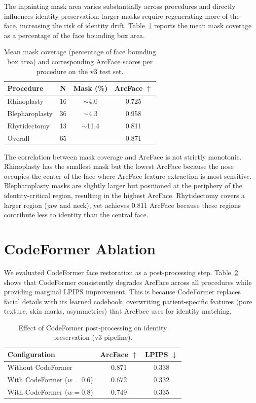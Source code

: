 \documentclass[10pt,twocolumn,letterpaper]{article}
\begin{document}
The inpainting mask area varies substantially across procedures and
directly influences identity preservation: larger masks require
regenerating more of the face, increasing the risk of identity drift.
Table~\ref{tab:mask_coverage} reports the mean mask coverage as a
percentage of the face bounding box area.

\begin{table}[H]
\centering
\caption{Mean mask coverage (percentage of face bounding box area) and
corresponding ArcFace scores per procedure on the v3 test set.}
\label{tab:mask_coverage}
\begin{tabular}{@{}lccc@{}}
\toprule
\textbf{Procedure} & \textbf{N} & \textbf{Mask (\%)} & \textbf{ArcFace} $\uparrow$ \\
\midrule
Rhinoplasty     & 16 & $\sim$4.0  & 0.725 \\
Blepharoplasty  & 36 & $\sim$4.3  & 0.958 \\
Rhytidectomy    & 13 & $\sim$11.4 & 0.811 \\
\midrule
Overall         & 65 &            & 0.871 \\
\bottomrule
\end{tabular}
\end{table}

The correlation between mask coverage and ArcFace is not strictly
monotonic. Rhinoplasty has the smallest mask but the lowest ArcFace
because the nose occupies the center of the face where ArcFace feature
extraction is most sensitive. Blepharoplasty masks are slightly larger
but positioned at the periphery of the identity-critical region,
resulting in the highest ArcFace. Rhytidectomy covers a larger region
(jaw and neck), yet achieves 0.811 ArcFace because these regions
contribute less to identity than the central face.

\section{CodeFormer Ablation}

We evaluated CodeFormer face restoration as a post-processing step.
Table~\ref{tab:codeformer} shows that CodeFormer consistently degrades
ArcFace across all procedures while providing marginal LPIPS improvement.
This is because CodeFormer replaces facial details with its learned
codebook, overwriting patient-specific features (pore texture, skin
marks, asymmetries) that ArcFace uses for identity matching.

\begin{table}[H]
\centering
\caption{Effect of CodeFormer post-processing on identity preservation
(v3 pipeline).}
\label{tab:codeformer}
\begin{tabular}{@{}lcc@{}}
\toprule
\textbf{Configuration} & \textbf{ArcFace} $\uparrow$ & \textbf{LPIPS} $\downarrow$ \\
\midrule
Without CodeFormer          & 0.871 & 0.338 \\
With CodeFormer ($w{=}0.6$) & 0.672 & 0.332 \\
With CodeFormer ($w{=}0.8$) & 0.749 & 0.335 \\
\bottomrule
\end{tabular}
\end{table}
\end{document}
